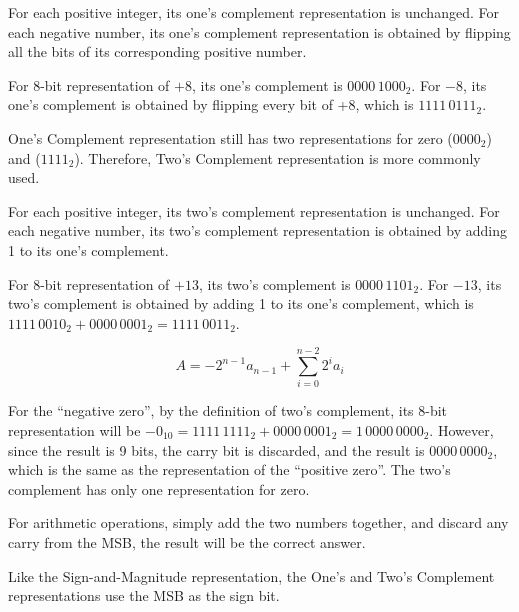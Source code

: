 \begin{definition}
    For each positive integer, its one's complement representation is unchanged. For each negative
    number, its one's complement representation is obtained by flipping all the bits of its
    corresponding positive number.

    \begin{example}
        For 8-bit representation of $+8$, its one's complement is $0000\,1000_2$.
        For $-8$, its one's complement is obtained by flipping every bit of +8, which is $1111\,0111_2$.
    \end{example}
\end{definition}

One's Complement representation still has two representations for zero ($0000_2$) and ($1111_2$).
Therefore, Two's Complement representation is more commonly used.

\begin{definition}
    For each positive integer, its two's complement representation is unchanged. For each negative
    number, its two's complement representation is obtained by adding 1 to its one's complement.

    \begin{example}
        For 8-bit representation of $+13$, its two's complement is $0000\,1101_2$. For $-13$, its
        two's complement is obtained by adding 1 to its one's complement, which is
        $1111\,0010_2 + 0000\,0001_2 = 1111\,0011_2$.
    \end{example}

    \begin{equation*}
        A = -2^{n-1}a_{n-1} + \sum_{i=0}^{n-2} 2^i a_i
    \end{equation*}
\end{definition}

For the ``negative zero'', by the definition of two's complement, its 8-bit representation will be
$-0_{10} = 1111\,1111_2 + 0000\,0001_2 = 1\,0000\,0000_2$. However, since the result is 9 bits, the
carry bit is discarded, and the result is $0000\,0000_2$, which is the same as the representation of
the ``positive zero''. The two's complement has only one representation for zero.

For arithmetic operations, simply add the two numbers together, and discard any carry from the MSB,
the result will be the correct answer.

\begin{remark}
    Like the Sign-and-Magnitude representation, the One's and Two's Complement representations use
    the MSB as the sign bit.
\end{remark}


